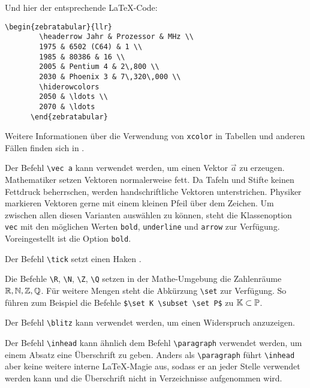 \documentclass{exercise}
\begin{document}
    Und hier der entsprechende \LaTeX-Code:
    
    \begin{lstlisting}[gobble=6]
      \begin{zebratabular}{llr}
        \headerrow Jahr & Prozessor & MHz \\
        1975 & 6502 (C64) & 1 \\
        1985 & 80386 & 16 \\
        2005 & Pentium 4 & 2\,800 \\
        2030 & Phoenix 3 & 7\,320\,000 \\
        \hiderowcolors
        2050 & \ldots \\
        2070 & \ldots
      \end{zebratabular}
    \end{lstlisting}
    
    Weitere Informationen über die Verwendung von \texttt{xcolor} in Tabellen
    und anderen Fällen finden sich in \cite{uwe-xcolor}.

    Der Befehl \lstinline-\vec a- kann verwendet werden, um einen Vektor $\vec a$
    zu erzeugen. Mathematiker setzen Vektoren normalerweise fett.
    Da Tafeln und Stifte keinen Fettdruck
    beherrschen, werden handschriftliche Vektoren unterstrichen.
    Physiker markieren
    Vektoren gerne mit einem kleinen Pfeil über dem Zeichen. Um zwischen allen
    diesen Varianten auswählen zu können, steht die Klassenoption
    \lstinline-vec- mit den möglichen Werten \lstinline-bold-,
    \lstinline-underline- und \lstinline-arrow- zur Verfügung.
    Voreingestellt ist die Option \lstinline-bold-.
    
    Der Befehl \lstinline-\tick- setzt einen Haken \tick.
    
    Die Befehle \lstinline-\R-, \lstinline-\N-, \lstinline-\Z-, \lstinline-\Q- setzen in der Mathe-Umgebung die Zahlenräume $\mathbb{R}, \mathbb{N}, \mathbb{Z}, \mathbb{Q}$. Für weitere Mengen steht die Abkürzung \lstinline-\set- zur
    Verfügung. So führen zum Beispiel die Befehle \lstinline-$\set K \subset \set P$- zu $\mathbb{K} \subset \mathbb{P}$.   
    
    Der Befehl \lstinline-\blitz- kann verwendet werden, um einen Widerspruch anzuzeigen. \blitz
    
     Der Befehl \lstinline-\inhead- kann ähnlich dem Befehl \lstinline-\paragraph- verwendet werden, um einem Absatz eine Überschrift zu geben. Anders als \lstinline-\paragraph- führt \lstinline-\inhead- aber keine weitere interne \LaTeX{}-Magie aus, sodass er an jeder Stelle verwendet werden kann und die Überschrift nicht in Verzeichnisse aufgenommen wird.
    
\end{document}
